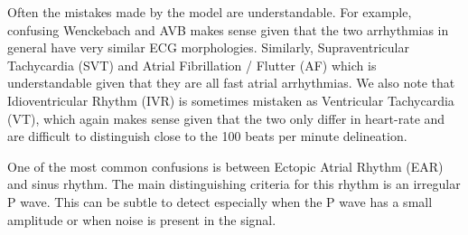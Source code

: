 Often the mistakes made by the model are understandable. For example, confusing
Wenckebach and AVB makes sense given that the two arrhythmias in general have
very similar ECG morphologies. Similarly, Supraventricular Tachycardia (SVT)
and Atrial Fibrillation / Flutter (AF) which is understandable given that they
are all fast atrial arrhythmias. We also note that Idioventricular Rhythm (IVR)
is sometimes mistaken as Ventricular Tachycardia (VT), which again makes sense
given that the two only differ in heart-rate and are difficult to distinguish
close to the 100 beats per minute delineation.

One of the most common confusions is between Ectopic Atrial Rhythm (EAR) and
sinus rhythm. The main distinguishing criteria for this rhythm is an irregular
P wave. This can be subtle to detect especially when the P wave has a small
amplitude or when noise is present in the signal.
